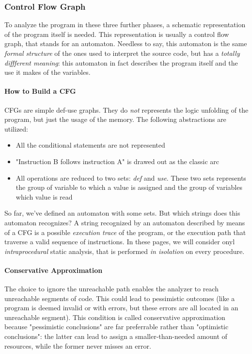                 \subsubsection{Control Flow Graph}
                    To analyze the program in these three further phases, a schematic representation of the program itself is needed. This representation is usually 
					a control flow graph, that stands for an automaton. Needless to say, this automaton is the same \emph{formal structure} of the ones used to 
					interpret the source code, but has a \emph{totally diffferent meaning}: this automaton in fact describes the program itself and the use it makes 
					of the variables.
                    
                    \paragraph{How to Build a CFG}
                        CFGs are simple def-use graphs. They do \emph{not} represents the logic unfolding of the program, but just the usage of the memory. The 
						following abstractions are utilized:
                        \begin{itemize}
                            \item All the conditional statements are not represented
                            \item "Instruction B follows instruction A" is drawed out as the classic arc
                            \item All operations are reduced to two sets: \emph{def} and \emph{use}. These two sets represents the group of variable to which a value 
							is assigned and the group of variables which value is read
                        \end{itemize}
                        So far, we've defined an automaton with some sets. But which strings does this automaton recognizes? A string recognized by an automaton 
						described by means of a CFG is a possible \emph{execution trace} of the program, or the execution path that traverse a valid sequence of 
						instructions. In these pages, we will consider onyl \emph{intraprocedural} static analysis, that is performed \emph{in isolation} on every 
						procedure.
                    
                    \paragraph{Conservative Approximation}
                        The choice to ignore the unreachable path enables the analyzer to reach unreachable segments of code. This could lead to pessimistic outcomes 
						(like a program is deemed invalid or with errors, but these errors are all located in an unreachable segment). This condition is called 
						conservative approximation because "pessimistic conclusions" are far preferrable rather than "optimistic conclusions": the latter can lead 
						to assign a smaller-than-needed amount of resources, while the former never misses an error.
                
